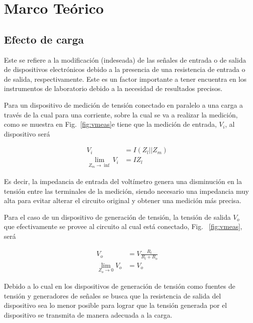 \section{Marco Teórico}

\subsection{Efecto de carga}
Este se refiere a la modificación (indeseada) de las señales
de entrada o de salida de dispositivos electrónicos debido a la presencia de una 
resistencia de entrada o de salida, respectivamente. Este es un factor importante
a tener encuentra en los instrumentos de laboratorio debido a la necesidad de 
resultados precisos.

Para un dispositivo de medición de tensión conectado en paralelo a una carga a 
través de la cual para una corriente, sobre la cual se va a realizar la medición, 
como se muestra en Fig.~\ref{fig:vmeas}e tiene que la medición de entrada, 
$V_i$, al dispositivo será


\vspace{-20pt}
\begin{align*}
    V_i &= I(Z_l || Z_m) \\
    \lim_{Z_m\to\inf} V_i &= IZ_l
    \label{Ecucaion de paralelo con Zm inf}
\end{align*}


Es decir, la impedancia de entrada del voltímetro genera una disminución en la
tensión entre las terminales de la medición, siendo necesario una impedancia
muy alta para evitar alterar el circuito original y obtener una medición más 
precisa.

Para el caso de un dispositivo de generación de tensión, la tensión de salida 
$V_o$ que efectivamente se provee al circuito al cual está conectado,
Fig.~ \ref{fig:vmeas}, será



\begin{equation}
    \begin{split}
        V_o &= V\frac{R_l}{R_l + R_o} \\
    \lim_{Z_o\to 0} V_o &= V_o
    \label{2}
    \end{split}
\end{equation}


Debido a lo cual en los dispositivos de generación de tensión como fuentes de 
tensión y generadores de señales se busca que la resistencia de salida del dispositivo sea lo menor posible para lograr que la tensión generada por el 
dispositivo se transmita de manera adecuada a la carga.

